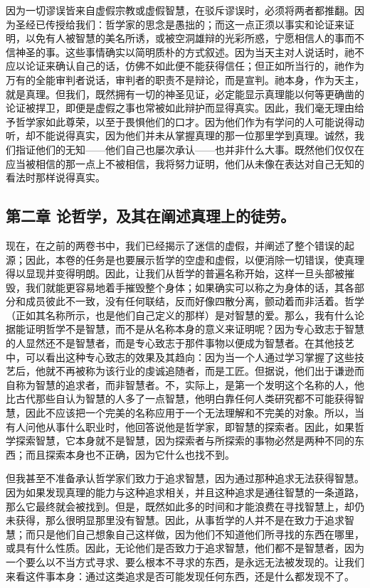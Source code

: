 因为一切谬误皆来自虚假宗教或虚假智慧，在驳斥谬误时，必须将两者都推翻。因为圣经已传授给我们：哲学家的思念是愚拙的；而这一点正须以事实和论证来证明，以免有人被智慧的美名所诱，或被空洞雄辩的光彩所惑，宁愿相信人的事而不信神圣的事。这些事情确实以简明质朴的方式叙述。因为当天主对人说话时，祂不应以论证来确认自己的话，仿佛不如此便不能获得信任；但正如所当行的，祂作为万有的全能审判者说话，审判者的职责不是辩论，而是宣判。祂本身，作为天主，就是真理。但我们，既然拥有一切的神圣见证，必定能显示真理能以何等更确凿的论证被捍卫，即便是虚假之事也常被如此辩护而显得真实。因此，我们毫无理由给予哲学家如此尊荣，以至于畏惧他们的口才。因为他们作为有学问的人可能说得动听，却不能说得真实，因为他们并未从掌握真理的那一位那里学到真理。诚然，我们指证他们的无知——他们自己也屡次承认——也并非什么大事。既然他们仅仅在应当被相信的那一点上不被相信，我将努力证明，他们从未像在表达对自己无知的看法时那样说得真实。\par


\subsection{第二章 论哲学，及其在阐述真理上的徒劳。}

现在，在之前的两卷书中，我们已经揭示了迷信的虚假，并阐述了整个错误的起源；因此，本卷的任务是也要展示哲学的空虚和虚假，以便消除一切错误，使真理得以显现并变得明朗。因此，让我们从哲学的普遍名称开始，这样一旦头部被摧毁，我们就能更容易地着手摧毁整个身体；如果确实可以称之为身体的话，其各部分和成员彼此不一致，没有任何联结，反而好像四散分离，颤动着而非活着。哲学（正如其名称所示，也是他们自己定义的那样）是对智慧的爱。那么，我有什么论据能证明哲学不是智慧，而不是从名称本身的意义来证明呢？因为专心致志于智慧的人显然还不是智慧者，而是专心致志于那件事物以便成为智慧者。在其他技艺中，可以看出这种专心致志的效果及其趋向：因为当一个人通过学习掌握了这些技艺后，他就不再被称为该行业的虔诚追随者，而是工匠。但据说，他们出于谦逊而自称为智慧的追求者，而非智慧者。不，实际上，是第一个发明这个名称的人，他比古代那些自认为智慧的人多了一点智慧，他明白靠任何人类研究都不可能获得智慧，因此不应该把一个完美的名称应用于一个无法理解和不完美的对象。所以，当有人问他从事什么职业时，他回答说他是哲学家，即智慧的探索者。因此，如果哲学探索智慧，它本身就不是智慧，因为探索者与所探索的事物必然是两种不同的东西；而且探索本身也不正确，因为它什么也找不到。\par

但我甚至不准备承认哲学家们致力于追求智慧，因为通过那种追求无法获得智慧。因为如果发现真理的能力与这种追求相关，并且这种追求是通往智慧的一条道路，那么它最终就会被找到。但是，既然如此多的时间和才能浪费在寻找智慧上，却仍未获得，那么很明显那里没有智慧。因此，从事哲学的人并不是在致力于追求智慧；而只是他们自己想象自己这样做，因为他们不知道他们所寻找的东西在哪里，或具有什么性质。因此，无论他们是否致力于追求智慧，他们都不是智慧者，因为一个要么以不当方式寻求、要么根本不寻求的东西，是永远无法被发现的。让我们来看这件事本身：通过这类追求是否可能发现任何东西，还是什么都发现不了。\par

